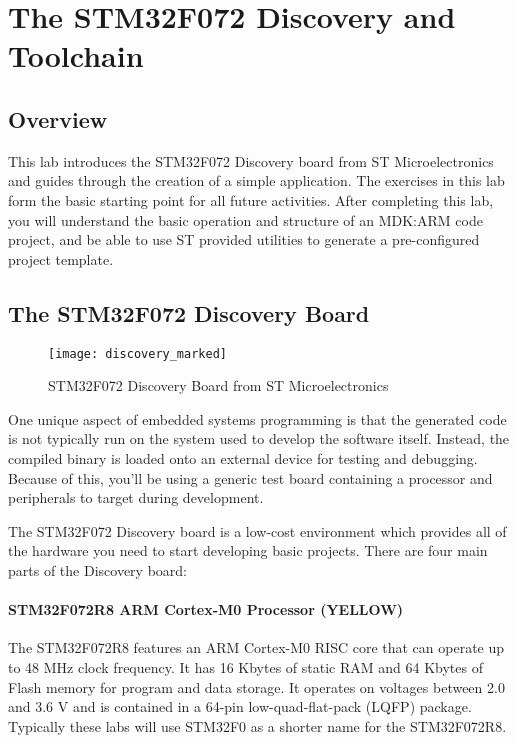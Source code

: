\documentclass[11pt,fleqn]{book} %
\begin{document}
	



\chapter{The STM32F072 Discovery and Toolchain}

\section{Overview}
This lab introduces the STM32F072 Discovery board from ST Microelectronics and guides through the creation of a simple application. The exercises in this lab form the basic starting point for all future activities. After completing this lab, you will understand the basic operation and structure of an MDK:ARM code project, and be able to use ST provided utilities to generate a pre-configured project template. 

\section{The STM32F072 Discovery Board}

\begin{figure}[h]
	\centering\texttt{[image: discovery\_marked]}
	\caption{STM32F072 Discovery Board from ST Microelectronics}
\end{figure}

One unique aspect of embedded systems programming is that the generated code is not typically run on the system used to develop the software itself. Instead, the compiled binary is loaded onto an external device for testing and debugging. Because of this, you'll be using a generic test board containing a processor and peripherals to target during development. 

The STM32F072 Discovery board is a low-cost environment which provides all of the hardware you need to start developing basic projects. There are four main parts of the Discovery board: 

\subsubsection*{STM32F072R8 ARM Cortex-M0 Processor ({\color{yellow!80!black}YELLOW})}
The STM32F072R8 features an ARM Cortex-M0 RISC core that can operate up to 48 MHz clock frequency. It has 16 Kbytes of static RAM and 64 Kbytes of Flash memory for program and data storage. It operates on voltages between 2.0 and 3.6 V and is contained in a 64-pin low-quad-flat-pack (LQFP) package. Typically these labs will use STM32F0 as a shorter name for the STM32F072R8.
\end{document}
